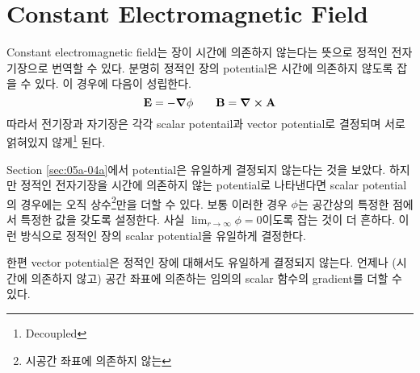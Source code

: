 \section[Constant EM Field]{Constant Electromagnetic Field}
\label{sec:05a-05a}

Constant electromagnetic field는 장이 시간에 의존하지 않는다는 뜻으로 정적인 전자기장으로 번역할 수 있다. 분명히 정적인 장의 potential은 시간에 의존하지 않도록 잡을 수 있다. 이 경우에 다음이 성립한다.
\begin{equation}\label{eq:ll1901}
    \vb{E} = - \grad \phi \qquad \vb{B} = \curl \vb{A}
\end{equation}
따라서 전기장과 자기장은 각각 scalar potentail과 vector potential로 결정되며 서로 얽혀있지 않게\footnote{Decoupled} 된다.

Section \ref{sec:05a-04a}에서 potential은 유일하게 결정되지 않는다는 것을 보았다. 하지만 정적인 전자기장을 시간에 의존하지 않는 potential로 나타낸다면 scalar potential의 경우에는 오직 상수\footnote{시공간 좌표에 의존하지 않는}만을 더할 수 있다. 보통 이러한 경우 $\phi$는 공간상의 특정한 점에서 특정한 값을 갖도록 설정한다. 사실 $\lim _{r \to \infty} \phi = 0$이도록 잡는 것이 더 흔하다. 이런 방식으로 정적인 장의 scalar potential을 유일하게 결정한다.

한편 vector potential은 정적인 장에 대해서도 유일하게 결정되지 않는다. 언제나 (시간에 의존하지 않고) 공간 좌표에 의존하는 임의의 scalar 함수의 gradient를 더할 수 있다.
